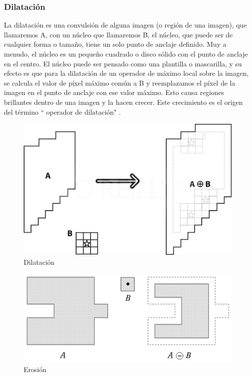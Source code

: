 \subsubsection{Dilatación}
La dilatación es una convulsión de alguna imagen (o región de una imagen), que llamaremos A, con un núcleo que llamaremos B,
el núcleo, que puede ser de cualquier forma o tamaño, tiene un solo punto de anclaje definido. Muy  a menudo, el núcleo es un
pequeño cuadrado o disco sólido con el punto de anclaje en el centro. El núcleo puede ser pensado como una plantilla  o
mascarilla, y su efecto es que para la dilatación de un operador de máximo local sobre la imagen, se calcula el valor de píxel
máximo común a B y reemplazamos el píxel de la imagen en el punto de anclaje con ese valor máximo. Esto causa regiones brillantes
dentro de una imagen y la hacen crecer. Este crecimiento es el origen del término `` operador de dilatación" \cite{BookOpenCv}. 

\begin{figure}[hbtp]

\centering
\includegraphics[scale=0.3]{imagenes/erosion-model.png}
\caption{Dilatación}
\end{figure}
\begin{figure}[hbtp]


\centering
\includegraphics[scale=1]{imagenes/erosion.png}
\caption{Erosión}
\label{fig:erosion}
\end{figure}


